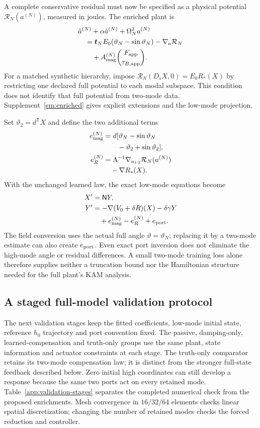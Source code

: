 A complete conservative residual must now be specified as a physical
potential $\mathcal R_N(a^{(N)})$, measured in joules. The enriched
plant is
\begin{align}
 &\ddot a^{(N)}+\alpha\dot a^{(N)}+\Omega_N^2a^{(N)}\nonumber\\
 &\quad=\boldsymbol t_NE_0(\vartheta_N-\sin\vartheta_N)
       -\nabla_a\mathcal R_N\nonumber\\
 &\qquad+A_{\rm mag}^{(N)}\binom{F_{\rm app}}{\tau_{B,\rm app}}.
 \label{app:enriched-plant}
\end{align}
For a matched synthetic hierarchy, impose
$\mathcal R_N(D_sX,0)=E_0R_*(X)$ by restricting one declared full
potential to each modal subspace. This condition does not identify
that full potential from two-mode data. Supplement~\ref{sm:enriched}
gives explicit extensions and the low-mode projection.

Set $\vartheta_2=d^{\mathsf T}X$ and define the two additional terms
\begin{align}
 e_{\rm mag}^{(N)}
 &=d[\vartheta_N-\sin\vartheta_N\nonumber\\
 &\qquad-\vartheta_2+\sin\vartheta_2],\nonumber\\
 e_R^{(N)}
 &=\Lambda^{-1}\nabla_{a_{1:2}}\mathcal R_N(a^{(N)})\nonumber\\
 &\quad-\nabla R_*(X).
 \label{app:enriched-defects}
\end{align}
With the unchanged learned law, the exact low-mode equations become
\begin{align}
 X'&=\mathsf N Y,\nonumber\\
 Y'&=-\nabla(V_0+\delta R)(X)-\delta\gamma Y\nonumber\\
   &\quad+e_{\rm mag}^{(N)}-e_R^{(N)}+e_{\rm port}.
 \label{app:enriched-closed-loop}
\end{align}
The field conversion uses the actual full angle
$\vartheta=\vartheta_N$; replacing it by a two-mode estimate can also
create $e_{\rm port}$. Even exact port inversion does not eliminate the
high-mode angle or residual differences. A small two-mode training
loss alone therefore supplies neither a truncation bound nor the
Hamiltonian structure needed for the full plant's KAM analysis.

\subsection{A staged full-model validation protocol}
\label{app:staged-validation}
The next validation stages keep the fitted coefficients, low-mode
initial state, reference $h_0$ trajectory and port convention fixed.
The passive, damping-only, learned-compensation and truth-only groups
use the same plant, state information and actuator constraints at each
stage. The truth-only comparator retains its two-mode compensation
law; it is distinct from the stronger full-state feedback described
below. Zero initial high coordinates can still develop a response
because the same two ports act on every retained mode.
Table~\ref{app:validation-stages} separates the completed
numerical check from the proposed enrichments. Mesh convergence in
$16/32/64$ elements checks linear spatial discretization; changing the
number of retained modes checks the forced reduction and controller.

